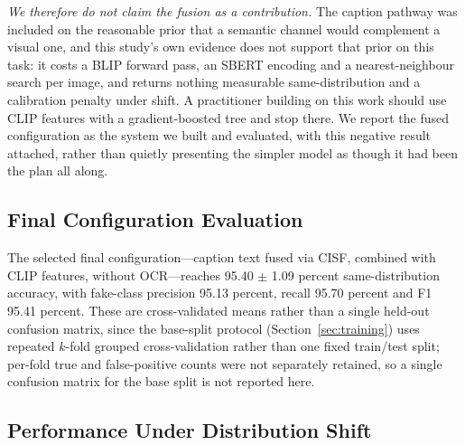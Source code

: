 \documentclass[conference,a4paper]{IEEEtran}
\begin{document}
\emph{We therefore do not claim the fusion as a contribution.} The caption
pathway was included on the reasonable prior that a semantic channel would
complement a visual one, and this study's own evidence does not support that
prior on this task: it costs a BLIP forward pass, an SBERT encoding and a
nearest-neighbour search per image, and returns nothing measurable
same-distribution and a calibration penalty under shift. A practitioner
building on this work should use CLIP features with a gradient-boosted tree
and stop there. We report the fused configuration as the system we built and
evaluated, with this negative result attached, rather than quietly presenting
the simpler model as though it had been the plan all along.

\subsection{Final Configuration Evaluation}

The selected final configuration---caption text fused via CISF, combined with
CLIP features, without OCR---reaches 95.40 $\pm$ 1.09 percent
same-distribution accuracy, with fake-class precision 95.13 percent, recall
95.70 percent and F1 95.41 percent. These are cross-validated means rather
than a single held-out confusion matrix, since the base-split protocol
(Section~\ref{sec:training}) uses repeated $k$-fold grouped cross-validation
rather than one fixed train/test split; per-fold true and false-positive counts were
not separately retained, so a single confusion matrix for the base split is
not reported here.

\subsection{Performance Under Distribution Shift}
\label{sec:shift}
\end{document}
